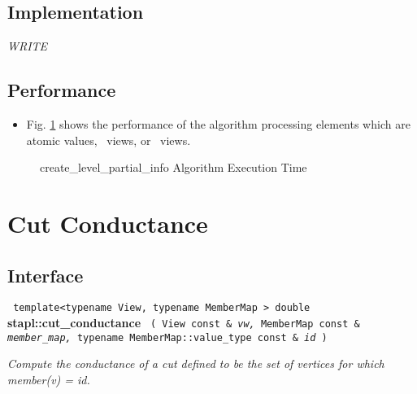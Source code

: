 \subsection{Implementation} \label{sec-create-level-part-alg-impl}

\textit{WRITE}

\subsection{Performance} \label{sec-create-level-part-alg-perf}

\begin{itemize}
\item
Fig. \ref{fig:cr-level-part-alg-exec-exper}
shows the performance of the algorithm processing
elements which are atomic values, \stl\ views, or \stapl\ views.
\end{itemize}

\begin{figure}[p]
\caption{ create\_level\_partial\_info Algorithm Execution Time}
\label{fig:cr-level-part-alg-exec-exper}
\end{figure}


\section{ Cut Conductance}
\label{sec-cut-cond-alg}

\subsection{Interface} \label{sec-cut-cond-alg-inter}

\noindent
\texttt{%
template<typename View, typename MemberMap >
\newline
double 
}
\newline
\textbf{stapl::cut\_conductance}%
\newline
\texttt{%
(
View const \&
\textit{vw,}%
MemberMap const \&
\textit{member\_map,}%
typename MemberMap::value\_type const \&
\textit{id}%
)     
}
\vspace{0.4cm}

\textit{
Compute the conductance of a cut defined to be the set of vertices for which member(v) = id.
}
\vspace{0.4cm}

